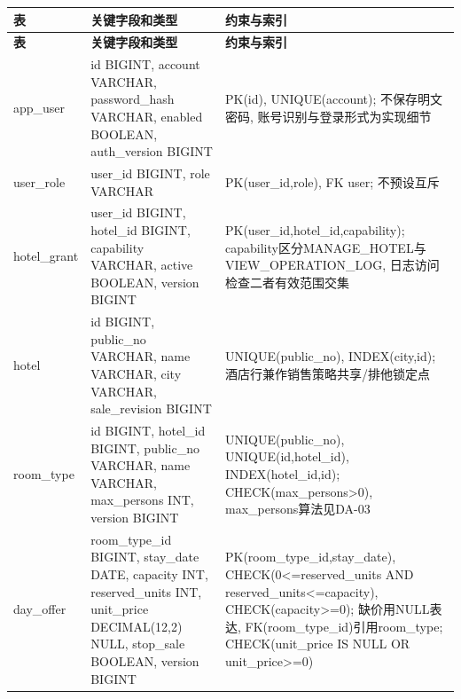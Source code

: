 \documentclass[cn,nofont,11pt,a4paper]{elegantpaper}
\begin{document}
\begingroup\small\setlength{\tabcolsep}{4pt}\renewcommand{\arraystretch}{1.28}
\begin{longtable}{>{\RaggedRight\arraybackslash}p{}>{\RaggedRight\arraybackslash}p{}>{\RaggedRight\arraybackslash}p{}}
\toprule
\bfseries 表 & \bfseries 关键字段和类型 & \bfseries 约束与索引 \\
\midrule\endfirsthead
\toprule
\bfseries 表 & \bfseries 关键字段和类型 & \bfseries 约束与索引 \\
\midrule\endhead
\midrule\multicolumn{3}{r}{\footnotesize 续下页}\endfoot
\bottomrule\endlastfoot
app\_\allowbreak{}\allowbreak{}user & id BIGINT, account VARCHAR, password\_\allowbreak{}\allowbreak{}hash VARCHAR, enabled BOOLEAN, auth\_\allowbreak{}\allowbreak{}version BIGINT & PK(id), UNIQUE(account); 不保存明文密码, 账号识别与登录形式为实现细节 \\
user\_\allowbreak{}\allowbreak{}role & user\_\allowbreak{}\allowbreak{}id BIGINT, role VARCHAR & PK(user\_\allowbreak{}\allowbreak{}id,role), FK user; 不预设互斥 \\
hotel\_\allowbreak{}\allowbreak{}grant & user\_\allowbreak{}\allowbreak{}id BIGINT, hotel\_\allowbreak{}\allowbreak{}id BIGINT, capability VARCHAR, active BOOLEAN, version BIGINT & PK(user\_\allowbreak{}\allowbreak{}id,hotel\_\allowbreak{}\allowbreak{}id,capability); capability区分MANAGE\_\allowbreak{}\allowbreak{}HOTEL与VIEW\_\allowbreak{}\allowbreak{}OPERATION\_\allowbreak{}\allowbreak{}LOG, 日志访问检查二者有效范围交集 \\
hotel & id BIGINT, public\_\allowbreak{}\allowbreak{}no VARCHAR, name VARCHAR, city VARCHAR, sale\_\allowbreak{}\allowbreak{}revision BIGINT & UNIQUE(public\_\allowbreak{}\allowbreak{}no), INDEX(city,id); 酒店行兼作销售策略共享/\allowbreak{}排他锁定点 \\
room\_\allowbreak{}\allowbreak{}type & id BIGINT, hotel\_\allowbreak{}\allowbreak{}id BIGINT, public\_\allowbreak{}\allowbreak{}no VARCHAR, name VARCHAR, max\_\allowbreak{}\allowbreak{}persons INT, version BIGINT & UNIQUE(public\_\allowbreak{}\allowbreak{}no), UNIQUE(id,hotel\_\allowbreak{}\allowbreak{}id), INDEX(hotel\_\allowbreak{}\allowbreak{}id,id); CHECK(max\_\allowbreak{}\allowbreak{}persons>0), max\_\allowbreak{}\allowbreak{}persons算法见DA-03 \\
day\_\allowbreak{}\allowbreak{}offer & room\_\allowbreak{}\allowbreak{}type\_\allowbreak{}\allowbreak{}id BIGINT, stay\_\allowbreak{}\allowbreak{}date DATE, capacity INT, reserved\_\allowbreak{}\allowbreak{}units INT, unit\_\allowbreak{}\allowbreak{}price DECIMAL(12,2) NULL, stop\_\allowbreak{}\allowbreak{}sale BOOLEAN, version BIGINT & PK(room\_\allowbreak{}\allowbreak{}type\_\allowbreak{}\allowbreak{}id,stay\_\allowbreak{}\allowbreak{}date), CHECK(0<=reserved\_\allowbreak{}\allowbreak{}units AND reserved\_\allowbreak{}\allowbreak{}units<=capacity), CHECK(capacity>=0); 缺价用NULL表达, FK(room\_\allowbreak{}\allowbreak{}type\_\allowbreak{}\allowbreak{}id)引用room\_\allowbreak{}\allowbreak{}type; CHECK(unit\_\allowbreak{}\allowbreak{}price IS NULL OR unit\_\allowbreak{}\allowbreak{}price>=0) \\

\end{longtable}
\end{document}
